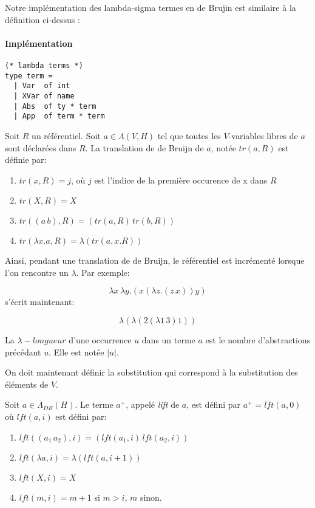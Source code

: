 Notre implémentation des lambda-sigma termes en de Brujin est similaire à la définition ci-dessus : 

\paragraph{Implémentation}

\begin{lstlisting}
(* lambda terms *)
type term =
  | Var  of int
  | XVar of name
  | Abs  of ty * term
  | App  of term * term
\end{lstlisting}

\begin{defn}
Soit $R$ un référentiel. Soit $a \in \Lambda(V,H)$ tel que toutes les $V$-variables libres de $a$ sont déclarées dans $R$. La translation de de Bruijn de $a$, notée $tr(a,R)$ est définie par:
\begin{enumerate}
    \item $tr(x,R) = j$, où $j$ est l’indice de la première occurence de x dans $R$
    \item $tr(X,R) = X$
    \item $tr((a \, b),R) = (tr(a,R) \, tr(b,R))$
    \item $tr(\lambda x . a, R) = \lambda (tr(a, x . R))$
\end{enumerate}
\end{defn}

Ainsi, pendant une translation de de Bruijn, le référentiel est incrémenté lorsque l’on rencontre un $\lambda$. Par exemple:

\[ \lambda x \, \lambda y . (x ( \lambda z . (z \, x)) y) \] 
s’écrit maintenant:

\[ \lambda ( \lambda (2 (\lambda 1 \, 3) 1 )) \]

\begin{defn}
La $\lambda-longueur$ d’une occurrence $u$ dans un terme $a$ est le nombre d'abstractions précédant $u$. Elle est notée $|u|$.
\end{defn}

On doit maintenant définir la substitution qui correspond à la substitution des éléments de $V$.

\begin{defn}
Soit $a \in \Lambda_{DB}(H)$. Le terme $a^{+}$, appelé \textit{lift} de $a$, est défini par $a^{+} = lft(a,0)$ où $lft(a,i)$ est défini par:
\begin{enumerate}
    \item $lft((a_1 \, a_2),i) = (lft(a_1,i) \, lft(a_2,i))$
    \item $lft(\lambda a, i) = \lambda (lft(a,i+1))$
    \item $lft(X,i) = X$
    \item $lft(m,i) = m + 1$ si $m > i$, $m$ sinon.
\end{enumerate}
\end{defn}


